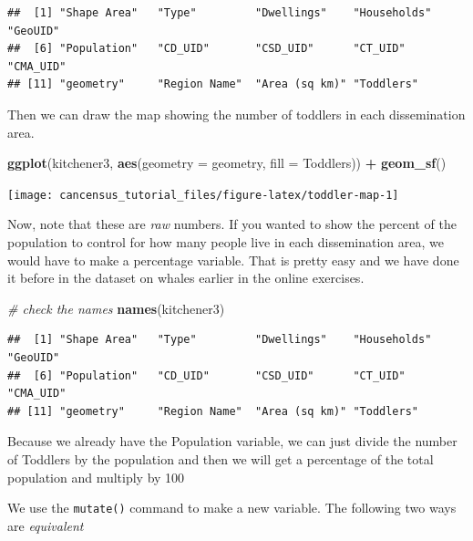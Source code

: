 \documentclass[
]{article}
\newenvironment{Shaded}{\begin{snugshade}}{\end{snugshade}}
\newcommand{\CommentTok}[1]{\textcolor[rgb]{0.56,0.35,0.01}{\textit{#1}}}
\newcommand{\DataTypeTok}[1]{\textcolor[rgb]{0.13,0.29,0.53}{#1}}
\newcommand{\KeywordTok}[1]{\textcolor[rgb]{0.13,0.29,0.53}{\textbf{#1}}}
\newcommand{\NormalTok}[1]{#1}
\newcommand{\OperatorTok}[1]{\textcolor[rgb]{0.81,0.36,0.00}{\textbf{#1}}}
\newcommand{\StringTok}[1]{\textcolor[rgb]{0.31,0.60,0.02}{#1}}
\begin{document}
\begin{verbatim}
##  [1] "Shape Area"   "Type"         "Dwellings"    "Households"   "GeoUID"      
##  [6] "Population"   "CD_UID"       "CSD_UID"      "CT_UID"       "CMA_UID"     
## [11] "geometry"     "Region Name"  "Area (sq km)" "Toddlers"
\end{verbatim}

Then we can draw the map showing the number of toddlers in each
dissemination area.

\begin{Shaded}
\begin{Highlighting}[]
\KeywordTok{ggplot}\NormalTok{(kitchener3, }\KeywordTok{aes}\NormalTok{(}\DataTypeTok{geometry =}\NormalTok{ geometry, }\DataTypeTok{fill =}\NormalTok{ Toddlers)) }\OperatorTok{+}\StringTok{ }\KeywordTok{geom\_sf}\NormalTok{()}
\end{Highlighting}
\end{Shaded}

\begin{center}\texttt{[image: cancensus\_tutorial\_files/figure-latex/toddler-map-1]} \end{center}

Now, note that these are \emph{raw} numbers. If you wanted to show the
percent of the population to control for how many people live in each
dissemination area, we would have to make a percentage variable. That is
pretty easy and we have done it before in the dataset on whales earlier
in the online exercises.

\begin{Shaded}
\begin{Highlighting}[]
\CommentTok{\# check the names}
\KeywordTok{names}\NormalTok{(kitchener3)}
\end{Highlighting}
\end{Shaded}

\begin{verbatim}
##  [1] "Shape Area"   "Type"         "Dwellings"    "Households"   "GeoUID"      
##  [6] "Population"   "CD_UID"       "CSD_UID"      "CT_UID"       "CMA_UID"     
## [11] "geometry"     "Region Name"  "Area (sq km)" "Toddlers"
\end{verbatim}

Because we already have the Population variable, we can just divide the
number of Toddlers by the population and then we will get a percentage
of the total population and multiply by 100

We use the \texttt{mutate()} command to make a new variable. The
following two ways are \emph{equivalent}
\end{document}
